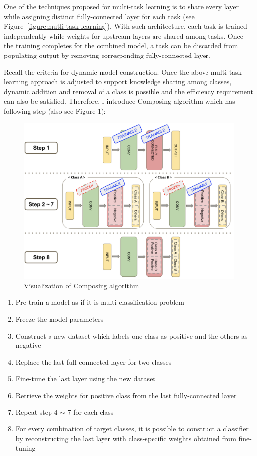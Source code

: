 \documentclass{article}
\begin{document}
One of the techniques proposed for multi-task learning is to share every layer while assigning distinct fully-connected layer for each task (see Figure~\ref{figure:mutli-task-learning}). With such architecture, each task is trained independently while weights for upstream layers are shared among tasks. Once the training completes for the combined model, a task can be discarded from populating output by removing corresponding fully-connected layer.

Recall the criteria for dynamic model construction. Once the above multi-task learning approach is adjusted to support knowledge sharing among classes, dynamic addition and removal of a class is possible and the efficiency requirement can also be satisfied. Therefore, I introduce Composing algorithm which has following step (also see Figure \ref{figure:composing_algo}):

\begin{figure}[t]
    \centering
    \includegraphics[scale=0.3,trim={0mm 0mm 0mm 0mm},clip]{composing_algo.png}
    \caption{Visualization of Composing algorithm}
    \label{figure:composing_algo}
\end{figure}


\begin{enumerate}
    \item Pre-train a model as if it is multi-classification problem
    \item Freeze the model parameters
    \item Construct a new dataset which labels one class as positive and the others as negative
    \item Replace the last full-connected layer for two classes
    \item Fine-tune the last layer using the new dataset
    \item Retrieve the weights for positive class from the last fully-connected layer
    \item Repeat step 4 $\sim$ 7 for each class
    \item For every combination of target classes, it is possible to construct a classifier by reconstructing the last layer with class-specific weights obtained from fine-tuning
\end{enumerate}
\end{document}
